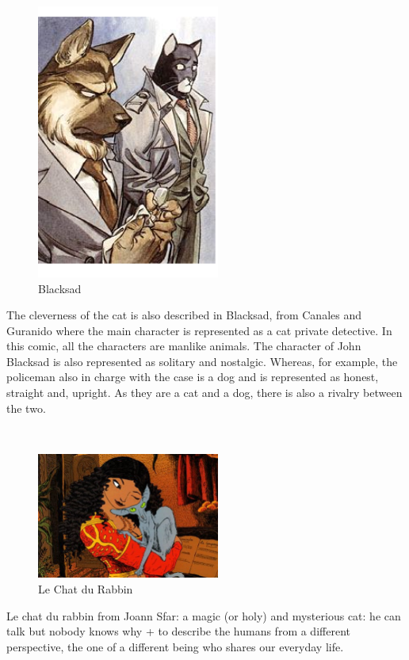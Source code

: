 \documentclass[a0,portrait,20pt]{a0poster}
\begin{document}
\begin{multicols}{2}
~

\vspace{2cm}

\begin{figure}\includegraphics[width=6cm]{blacksad.png}\caption{Blacksad}\end{figure}
The cleverness of the cat is also described in Blacksad, from Canales and Guranido where the main character is represented as a cat private detective. In this comic, all the characters are manlike animals. The character of John Blacksad is also represented as solitary and nostalgic. Whereas, for example, the policeman also in charge with the case is a dog and is represented as honest, straight and, upright. As they are a cat and a dog, there is also a rivalry between the two.

~


\begin{figure}\includegraphics[width=6cm]{rabin.jpg}\caption{Le Chat du Rabbin}\end{figure}
Le chat du rabbin from Joann Sfar: a magic (or holy) and mysterious cat: he can talk but nobody knows why + to describe the humans from a different perspective, the one of a different being who shares our everyday life.


\end{multicols}
\end{document}
